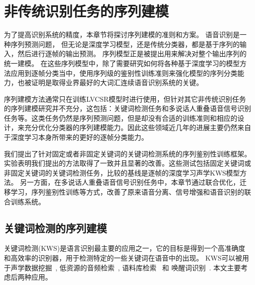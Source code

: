 

\chapter{非传统识别任务的序列建模}
\label{chap:seqtrain}


为了提高识别系统的精度，本章节将探讨序列建模的准则和方案。
语音识别是一种序列预测问题，%
但无论是深度学习模型，还是传统分类器，都是基于序列的输入，然后进行逐帧的输出预测。
%
序列模型正是被提出用来解决对整个输出序列的统一建模。
在这些序列模型中，除了需要研究如何将各种基于深度学习的模型方法应用到逐帧分类当中，使用序列级的鉴别性训练准则来强化模型的序列分类能力，也被证明是取得业界最好的大词汇连续语音识别系统的关键。

序列建模方法通常只在训练LVCSR模型时进行使用，但针对其它非传统识别任务的序列建模研究并不充分，这包括：关键词检测任务和多说话人重叠语音信号识别任务等。这类任务仍然是序列预测问题，但是却没有合适的训练准则和相应的设计，来充分优化分类器的序列建模能力。因此这些领域近几年的进展主要仍然来自于深度学习本身所带来的更好的逐帧分类能力。

我们提出了针对固定或者非固定关键词的关键词检测系统的序列鉴别性训练框架。实验表明我们提出的方法取得了一致并且显著的改善。这些测试包括固定关键词或非固定关键词的关键词检测任务，比较的基线是逐帧的深度学习声学KWS模型方法。
%
另一方面，在多说话人重叠语音信号识别任务中，本章节通过联合优化，迁移学习，序列鉴别性训练等方式，改善了原来语音分离、信号增强和语音识别的联合训练系统。


\section{关键词检测的序列建模}
\label{chap:kws}


关键词检测(KWS)是语言识别最主要的应用之一，它的目标是得到一个高准确度和高效率的识别器，用于检测特定的一些关键词在语音中的出现。
KWS可以被用于声学数据挖掘~\cite{zhou2005data}, 低资源的音频检索~\cite{shen2009comparison}, 
语料库检索~\cite{garofolo2000trec} 和 唤醒词识别~\cite{chen2014small}. 本文主要考虑后两种应用。

